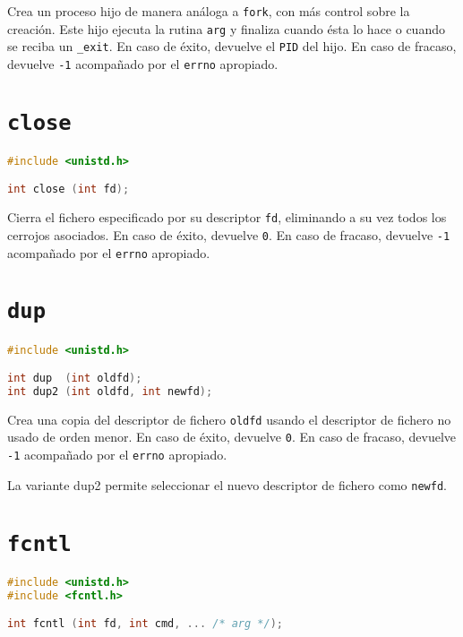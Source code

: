 Crea un proceso hijo de manera análoga a \texttt{fork}, con más control sobre la creación.
Este hijo ejecuta la rutina \texttt{arg} y finaliza cuando ésta lo hace o cuando se reciba un \texttt{\_exit}.
En caso de éxito, devuelve el \texttt{PID} del hijo.
En caso de fracaso, devuelve \texttt{-1} acompañado por el \texttt{errno} apropiado.

\pagebreak

\section{\texttt{close}}\label{close}

\begin{lstlisting}[language=C]
#include <unistd.h>

int close (int fd);
\end{lstlisting}

Cierra el fichero especificado por su descriptor \texttt{fd}, eliminando a su vez todos los cerrojos asociados.
En caso de éxito, devuelve \texttt{0}.
En caso de fracaso, devuelve \texttt{-1} acompañado por el \texttt{errno} apropiado.

\section{\texttt{dup}}\label{dup}

\begin{lstlisting}[language=C]
#include <unistd.h>

int dup  (int oldfd);
int dup2 (int oldfd, int newfd);
\end{lstlisting}

Crea una copia del descriptor de fichero \texttt{oldfd} usando el descriptor de fichero no usado de orden menor.
En caso de éxito, devuelve \texttt{0}.
En caso de fracaso, devuelve \texttt{-1} acompañado por el \texttt{errno} apropiado.

La variante dup2 permite seleccionar el nuevo descriptor de fichero como \texttt{newfd}.

\section{\texttt{fcntl}}\label{fcntl}

\begin{lstlisting}[language=C]
#include <unistd.h>
#include <fcntl.h>

int fcntl (int fd, int cmd, ... /* arg */);
\end{lstlisting}

